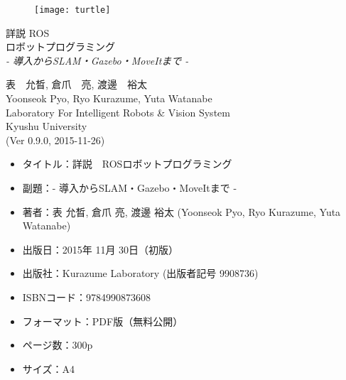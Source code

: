 \documentclass[11pt,fleqn]{book} %
\begin{document}
\begingroup
\thispagestyle{empty}
\centering
\vspace*{3cm}

\begin{figure}[htp]
\centering\hspace{30pt}\texttt{[image: turtle]}
\end{figure}

\vspace*{1cm}
\par\normalfont\fontsize{35}{35}\sffamily\selectfont
詳説 ROS\\%
ロボットプログラミング\\%
{\LARGE \textit{- 導入からSLAM・Gazebo・MoveItまで -}}\par
\vspace*{5cm}
{\Large 表　允晳, 倉爪　亮, 渡邊　裕太}\\
\vspace*{-0.5cm}
{\Large Yoonseok Pyo, Ryo Kurazume, Yuta Watanabe}\\
\vspace*{1cm}
{\Large Laboratory For Intelligent Robots \& Vision System\\Kyushu University}\\
\vspace*{2cm}
{\large (Ver 0.9.0, 2015-11-26)}\\ %
\endgroup

\newpage
\thispagestyle{empty}

\begin{itemize}[leftmargin=*]
\item タイトル：詳説　ROSロボットプログラミング
\item 副題：- 導入からSLAM・Gazebo・MoveItまで -
\item 著者：表 允晳, 倉爪 亮, 渡邊 裕太 (Yoonseok Pyo, Ryo Kurazume, Yuta Watanabe)
\item 出版日：2015年 11月 30日（初版）
\item 出版社：Kurazume Laboratory (出版者記号 9908736)
\item ISBNコード：9784990873608
\item フォーマット：PDF版（無料公開）
\item ページ数：300p
\item サイズ：A4
\end{itemize}
\vspace*{1cm}
\end{document}
